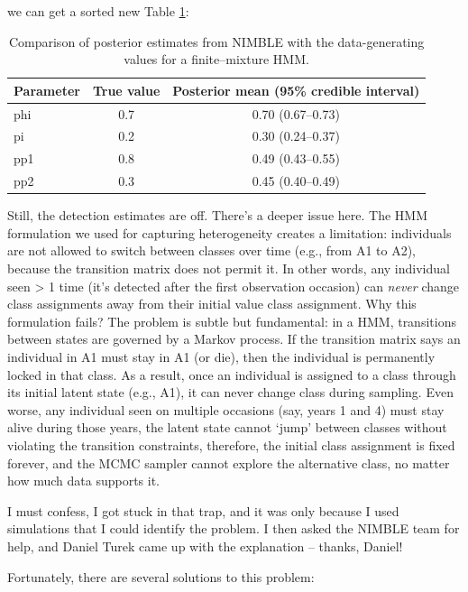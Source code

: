 \documentclass[
  12pt,
]{krantz}
\begin{document}
we can get a sorted new Table \ref{tab:simpar2}:

\begin{table}

\caption{\label{tab:simpar2}Comparison of posterior estimates from NIMBLE with the data-generating values for a finite--mixture HMM.}
\centering
\begin{tabular}[t]{l|c|c}
\hline
Parameter & True value & Posterior mean (95\% credible interval)\\
\hline
phi & 0.7 & 0.70 (0.67–0.73)\\
\hline
pi & 0.2 & 0.30 (0.24–0.37)\\
\hline
pp1 & 0.8 & 0.49 (0.43–0.55)\\
\hline
pp2 & 0.3 & 0.45 (0.40–0.49)\\
\hline
\end{tabular}
\end{table}

Still, the detection estimates are off. There's a deeper issue here. The HMM formulation we used for capturing heterogeneity creates a limitation: individuals are not allowed to switch between classes over time (e.g., from A1 to A2), because the transition matrix does not permit it. In other words, any individual seen \textgreater{} 1 time (it's detected after the first observation occasion) can \emph{never} change class assignments away from their initial value class assignment. Why this formulation fails? The problem is subtle but fundamental: in a HMM, transitions between states are governed by a Markov process. If the transition matrix says an individual in A1 must stay in A1 (or die), then the individual is permanently locked in that class. As a result, once an individual is assigned to a class through its initial latent state (e.g., A1), it can never change class during sampling. Even worse, any individual seen on multiple occasions (say, years 1 and 4) must stay alive during those years, the latent state cannot `jump' between classes without violating the transition constraints, therefore, the initial class assignment is fixed forever, and the MCMC sampler cannot explore the alternative class, no matter how much data supports it.

I must confess, I got stuck in that trap, and it was only because I used simulations that I could identify the problem. I then asked the NIMBLE team for help, and Daniel Turek came up with the explanation -- thanks, Daniel!

Fortunately, there are several solutions to this problem:
\end{document}

